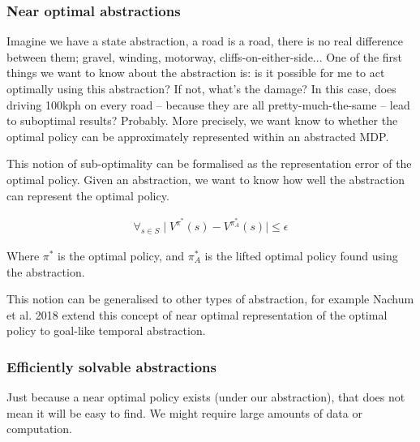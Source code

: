 \subsubsection{Near optimal abstractions}

Imagine we have a state abstraction, a road is a road, there is no real difference
between them; gravel, winding, motorway, cliffs-on-either-side...
One of the first things we want to know about the abstraction is:
is it possible for me to act optimally
using this abstraction? If not, what's the damage? In this case, does driving 100kph on every road --
because they are all pretty-much-the-same -- lead to suboptimal results? Probably.
More precisely, we want know to whether the optimal policy can be approximately represented within an abstracted MDP.

This notion of sub-optimality can be formalised as the representation error of the optimal
policy. \cite{Abel2017} Given an abstraction, we want to know how well the abstraction can represent the optimal policy.

\begin{align}
\forall_{s\in S} \mid V^{\pi^* }(s) - V^{\pi_{A}^* }(s) \mid \le \epsilon
\end{align}

Where $\pi^{* }$ is the optimal policy, and $\pi_{A}^{* }$ is the lifted optimal
policy found using the abstraction.

This notion can be generalised to other types of abstraction, for example
Nachum et al. 2018 \cite{Nachum2018} extend this concept of near optimal
representation of the optimal policy to goal-like temporal abstraction. \footnotemark[13]


\subsubsection{Efficiently solvable abstractions}

Just because a near optimal policy exists (under our abstraction), that does not mean it will be easy to find.
We might require large amounts of data or computation.


